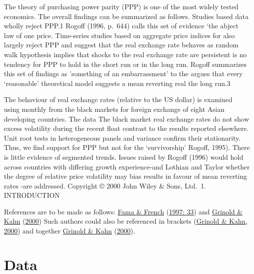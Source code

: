 \documentclass[11pt,preprint, authoryear]{elsarticle}
\numberwithin{equation}{section}
\numberwithin{figure}{section}
\numberwithin{table}{section}
\begin{document}
The theory of purchasing power parity (PPP) is one of the most widely
tested economics. The overall findings can be summarized as follows.
Studies based data wholly reject PPP.1 Rogoff (1996, p.~644) calls this
set of evidence `the abject law of one price. Time-series studies based
on aggregate price indices for also largely reject PPP and suggest that
the real exchange rate behaves as random walk hypothesis implies that
shocks to the real exchange rate are persistent is no tendency for PPP
to hold in the short run or in the long run. Rogoff summarizes this set
of findings as 'something of an embarrassment' to the argues that every
`reasonable' theoretical model suggests a mean reverting real the long
run.3

The behaviour of real exchange rates (relative to the US dollar) is
examined using monthly from the black markets for foreign exchange of
eight Asian developing countries. The data The black market real
exchange rates do not show excess volatility during the recent float
contrast to the results reported elsewhere. Unit root tests in
heterogeneous panels and variance confirm their stationarity. Thus, we
find support for PPP but not for the `survivorship' Rogoff, 1995). There
is little evidence of segmented trends. Issues raised by Rogoff (1996)
would hold across countries with differing growth experience-and Lothian
and Taylor whether the degree of relative price volatility may bias
results in favour of mean reverting rates -are addressed. Copyright ©
2000 John Wiley \& Sons, Ltd.~1. INTRODUCTION

References are to be made as follows:
\protect\hyperlink{ref-fama1997}{Fama \& French}
(\protect\hyperlink{ref-fama1997}{1997: 33}) and
\protect\hyperlink{ref-grinold2000}{Grinold \& Kahn}
(\protect\hyperlink{ref-grinold2000}{2000}) Such authors could also be
referenced in brackets (\protect\hyperlink{ref-grinold2000}{Grinold \&
Kahn, 2000}) and together \protect\hyperlink{ref-grinold2000}{Grinold \&
Kahn} (\protect\hyperlink{ref-grinold2000}{2000}).

\hypertarget{data}{%
\section{\texorpdfstring{Data \label{Data}}{Data }}\label{data}}
\end{document}
